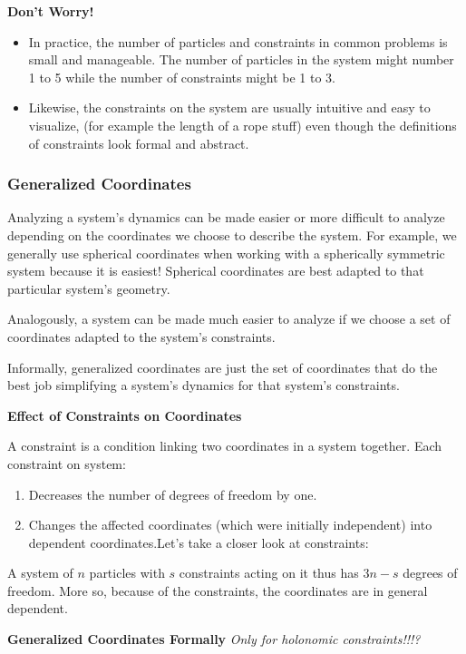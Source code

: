 \documentclass[11pt, a4paper]{article}
\begin{document}
\iffalse

\textbf{Don't Worry!} 
\begin{itemize}
	\item In practice, the number of particles and constraints in common problems is small and manageable. The number of particles in the system might number 1 to 5 while the number of constraints might be 1 to 3. 
	
	\item Likewise, the constraints on the system are usually intuitive and easy to visualize, (for example the length of a rope stuff) even though the definitions of constraints look formal and abstract.
\end{itemize}

\subsubsection{Generalized Coordinates}

Analyzing a system's dynamics can be made easier or more difficult to analyze depending on the coordinates we choose to describe the system. For example, we generally use spherical coordinates when working with a spherically symmetric system because it is easiest! Spherical coordinates are best adapted to that particular system's geometry.

Analogously, a system can be made much easier to analyze if we choose a set of coordinates adapted to the system's constraints.

Informally, generalized coordinates are just the set of coordinates that do the best job simplifying a system's dynamics for that system's constraints.

\textbf{Effect of Constraints on Coordinates}

A constraint is a condition linking two coordinates in a system together. Each constraint on system:
\begin{enumerate}
	\item Decreases the number of degrees of freedom by one.
	\item Changes the affected coordinates (which were initially independent) into dependent coordinates.Let's take a closer look at constraints:
\end{enumerate}

A system of $ n $ particles with $ s $ constraints acting on it thus has $ 3n - s $ degrees of freedom. More so, because of the constraints, the coordinates are in general dependent.

\textbf{Generalized Coordinates Formally} \textit{Only for holonomic constraints!!!?}
\end{document}
